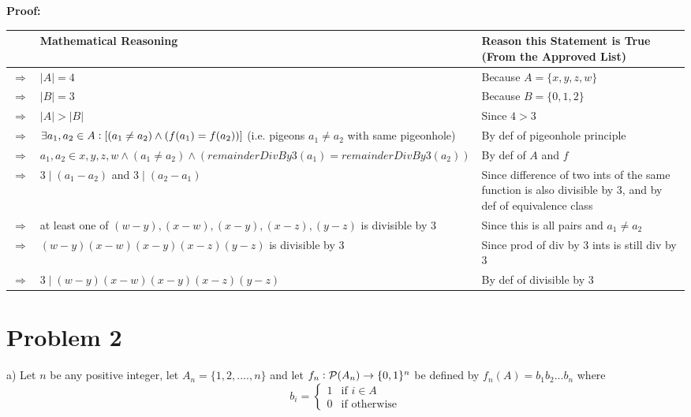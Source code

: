 \documentclass{article}
\begin{document}
\textbf{Proof:}
\begin{flushleft} 
	\begin{tabular}{|p{0.5cm}|p{5.6cm}|p{6cm}|}
        \hline
        & \textbf{Mathematical Reasoning} & \textbf{Reason this Statement is True (From the Approved List)} \\
        \hline
        $\Rightarrow$ & $|A| = 4$ & Because $A=\{x,y,z,w\}$ \\
        \hline
        $\Rightarrow$ & $|B| = 3$ & Because $B=\{0,1,2\}$ \\
        \hline
        $\Rightarrow$ & $|A|>|B|$ & Since $4>3$ \\ 
        \hline
        $\Rightarrow$ & $\exists a_1,a_2\in A\vcentcolon [(a_1\neq a_2)\land (f(a_1)=f(a_2))]$ (i.e. pigeons $a_1\neq a_2$ with same pigeonhole) & By def of pigeonhole principle \\
        \hline
        $\Rightarrow$ & $a_1,a_2\in{x,y,z,w}\land(a_1\neq a_2)\land(remainderDivBy3(a_1)=remainderDivBy3(a_2))$ & By def of $A$ and $f$ \\
        \hline
        $\Rightarrow$ & $3\mid (a_1-a_2)$ and $3\mid (a_2-a_1)$ & Since difference of two ints of the same function is also divisible by 3, and by def of equivalence class\\
        \hline
        $\Rightarrow$ & at least one of $(w-y),(x-w),(x-y),(x-z),(y-z)$ is divisible by 3 & Since this is all pairs and $a_1\neq a_2$\\
        \hline
        $\Rightarrow$ & $(w-y)(x-w)(x-y)(x-z)(y-z)$ is divisible by 3 & Since prod of div by 3 ints is still div by 3\\
        \hline
        $\Rightarrow$ & $3\mid (w-y)(x-w)(x-y)(x-z)(y-z)$ & By def of divisible by 3 \\
        \hline
	\end{tabular}
\end{flushleft}\vspace{20pt}


\pagebreak

\section{Problem 2}

a) Let $n$ be any positive integer, let $A_n=\{1,2,....,n\}$ and let $f_n\vcentcolon\mathcal{P}(A_n)\rightarrow\{0,1\}^n$ be defined by $f_n(A)=b_1b_2...b_n$ where
\begin{equation}
b_i=
    \begin{cases}
        1 & \text{if } i\in A \\
        0 & \text{if } \text{otherwise}
    \end{cases}
\end{equation}
\end{document}

